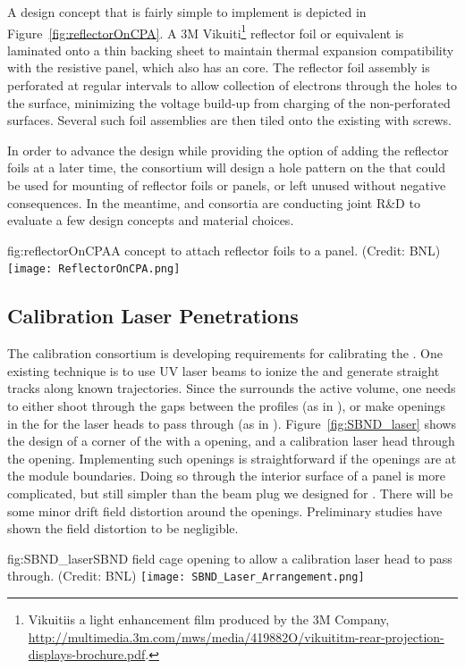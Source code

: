 A design concept that is fairly simple to implement %
is depicted in Figure~\ref{fig:reflectorOnCPA}.  A 3M Vikuiti\footnote{Vikuiti\texttrademark is a light enhancement film produced by the 3M Company,  \url{http://multimedia.3m.com/mws/media/419882O/vikuititm-rear-projection-displays-brochure.pdf}.} 
reflector foil or equivalent is laminated onto a thin \frfour backing sheet to maintain thermal expansion compatibility
with the resistive  panel, which also has an \frfour core. The reflector foil assembly is perforated at regular intervals to allow %
collection of electrons through the holes to the   surface, minimizing the voltage build-up from charging of the non-perforated surfaces.  Several such foil assemblies are then tiled onto the existing  with screws.

In order to advance the  design while providing the option of adding the reflector foils at a later time, the  consortium will design %
a hole pattern 
on the %
 that could be used for mounting of reflector foils or panels, or left unused without negative consequences. In the meantime,  and  consortia are conducting joint R\&D to evaluate a few design concepts and material choices. 


\begin{dunefigure}{fig:reflectorOnCPA}{A concept to attach reflector foils to a  panel. (Credit: BNL)}
\texttt{[image: ReflectorOnCPA.png]}
\end{dunefigure}

\subsection{Calibration Laser Penetrations}

The calibration consortium is developing requirements for calibrating the  \efield.  One existing technique is to use UV laser beams to ionize the  and generate straight tracks along known trajectories.  Since the  surrounds the  active volume, one needs to either shoot through the gaps between the  profiles (as in ), or make openings in the   for the laser heads to pass through (as in ).    Figure~\ref{fig:SBND_laser}  shows the design of a corner of the   with a   opening, and a calibration laser head through the opening.  Implementing such openings is straightforward if the openings are at the   module boundaries.  Doing so through the interior surface of a  panel is more complicated, but still simpler than the beam plug we designed for .  There will be some minor drift field distortion around the openings.  Preliminary  studies have shown the field distortion to be negligible. 

\begin{dunefigure}{fig:SBND_laser}{SBND field cage opening to allow a calibration laser head to pass through. (Credit: BNL)}
\texttt{[image: SBND\_Laser\_Arrangement.png]}
\end{dunefigure}


